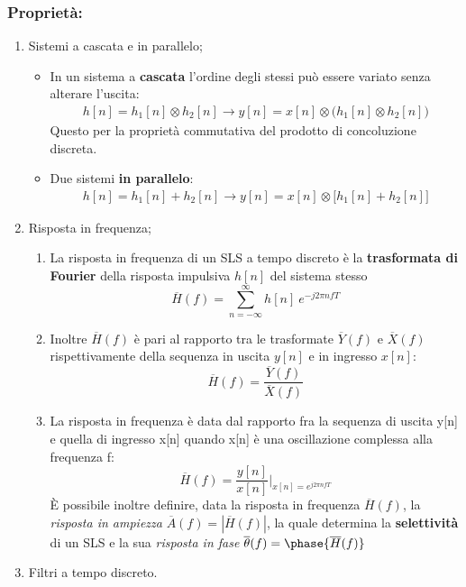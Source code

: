 \documentclass[
]{article}
\providecommand{\tightlist}{%
  \setlength{\itemsep}{0pt}\setlength{\parskip}{0pt}}
\begin{document}
\subsubsection{Proprietà:}\label{proprietuxe0-2}

\begin{enumerate}
\def\labelenumi{\arabic{enumi}.}
\setcounter{enumi}{26}
\item
  Sistemi a cascata e in parallelo;

  \begin{itemize}
  \tightlist
  \item
    In un sistema a \textbf{cascata} l'ordine degli stessi può essere
    variato senza alterare l'uscita: \begin{align*}
      h[n] = h_{1}[n] \otimes h_{2}[n] \to y[n] = x[n] \otimes \Big(h_{1}[n] \otimes h_{2}[n] \Big)
      \end{align*} Questo per la proprietà commutativa del prodotto di
    concoluzione discreta.
  \item
    Due sistemi \textbf{in parallelo}: \begin{align*}
      h[n] = h_{1}[n] + h_{2}[n] \to y[n] = x[n] \otimes \Big[ h_{1}[n] + h_{2}[n] \Big]
      \end{align*}
  \end{itemize}
\item
  Risposta in frequenza;

  \begin{enumerate}
  \def\labelenumii{\arabic{enumii}.}
  \tightlist
  \item
    La risposta in frequenza di un SLS a tempo discreto è la
    \textbf{trasformata di Fourier} della risposta impulsiva \(h[n]\)
    del sistema stesso \[
     \overline{H}(f) = \sum_{n=-\infty}^{\infty} h[n] \ e^{-j2\pi nfT}
     \]
  \item
    Inoltre \(\overline{H}(f)\) è pari al rapporto tra le trasformate
    \(\overline{Y}(f)\) e \(\overline{X}(f)\) rispettivamente della
    sequenza in uscita \(y[n]\) e in ingresso \(x[n]\): \[
     \overline{H}(f)=\frac{\overline{Y}(f)}{\overline{X}(f)}
     \]
  \item
    La risposta in frequenza è data dal rapporto fra la sequenza di
    uscita y{[}n{]} e quella di ingresso x{[}n{]} quando x{[}n{]} è una
    oscillazione complessa alla frequenza f: \[
     \overline{H}(f) = \frac{y[n]}{x[n]}\Bigg|_{x[n]=e^{j2\pi nfT}}
     \] È possibile inoltre definire, data la risposta in frequenza
    \(\overline{H}(f)\), la \emph{risposta in ampiezza}
    \(\overline{A}(f)=|\overline{H}(f)|\), la quale determina la
    \textbf{selettività} di un SLS e la sua \emph{risposta in fase}
    \(\overline{\theta}(f)=\phase{\overline{H}(f)}\)
  \end{enumerate}
\item
  Filtri a tempo discreto.


\end{enumerate}
\end{document}
